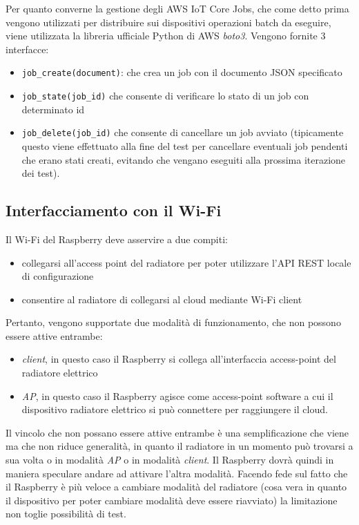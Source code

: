 \documentclass[12pt,a4paper,twoside,titlepage]{book}
\begin{document}
Per quanto converne la gestione degli AWS IoT Core Jobs, che come detto prima vengono
utilizzati per distribuire sui dispositivi operazioni batch da eseguire, viene
utilizzata la libreria ufficiale Python di AWS \textit{boto3}. Vengono fornite
3 interfacce:
\begin{itemize}
    \item \texttt{job\_create(document)}: che crea un job con il documento JSON specificato
    \item \texttt{job\_state(job\_id)} che consente di verificare lo stato di un job con determinato id
    \item \texttt{job\_delete(job\_id)} che consente di cancellare un job avviato (tipicamente
        questo viene effettuato alla fine del test per cancellare eventuali job pendenti che
        erano stati creati, evitando che vengano eseguiti alla prossima iterazione dei test).
\end{itemize}

\subsection{Interfacciamento con il Wi-Fi}

Il Wi-Fi del Raspberry deve asservire a due compiti:
\begin{itemize}
    \item collegarsi all'access point del radiatore per poter utilizzare l'API REST locale di configurazione
    \item consentire al radiatore di collegarsi al cloud mediante Wi-Fi client
\end{itemize}

Pertanto, vengono supportate due modalità di funzionamento, che non possono essere
attive entrambe:
\begin{itemize}
    \item \textit{client}, in questo caso il Raspberry si collega all'interfaccia
        access-point del radiatore elettrico
    \item \textit{AP}, in questo caso il Raspberry agisce come access-point software
        a cui il dispositivo radiatore elettrico si può connettere per raggiungere il
        cloud.
\end{itemize}

Il vincolo che non possano essere attive entrambe è una semplificazione che viene ma che
non riduce generalità, in quanto il radiatore in un momento può trovarsi a sua volta o in
modalità \textit{AP} o in modalità \textit{client}. Il Raspberry dovrà quindi in maniera
speculare andare ad attivare l'altra modalità. Facendo fede sul fatto che il Raspberry è
più veloce a cambiare modalità del radiatore (cosa vera in quanto il dispositivo per poter
cambiare modalità deve essere riavviato) la limitazione non toglie possibilità di test.
\end{document}
